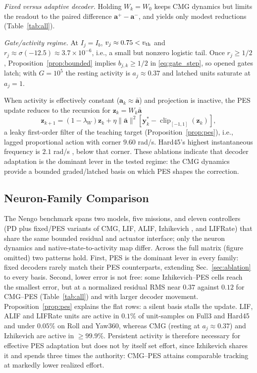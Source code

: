 \documentclass[letterpaper, 10 pt, conference]{ieeeconf}
\newcommand{\clip}{\operatorname{clip}}
\begin{document}
\emph{Fixed versus adaptive decoder.} Holding $W_k=W_0$ keeps CMG dynamics but limits the readout to the paired difference $\bm a^+-\bm a^-$, and yields only modest reductions (Table~\ref{tab:all}).

\emph{Gate/activity regime.} At $I_j=I_b$, $v_j\approx0.75<v_{\rm th}$ and $r_j\approx\sigma(-12.5)\approx3.7\times10^{-6}$, i.e., a small but nonzero logistic tail. Once $r_j\ge1/2$, Proposition~\ref{prop:bounded} implies $b_{j,k}\ge1/2$ in \eqref{eq:gate_step}, so opened gates latch; with $G=10^5$ the resting activity is $a_j\approx0.37$ and latched units saturate at $a_j=1$.

When activity is effectively constant ($\bm a_k\approx\bar{\bm a}$) and projection is inactive, the PES update reduces to the recursion for $\bm z_k=W_k\bar{\bm a}$
\begin{equation}
 \bm z_{k+1}=(1-\lambda_W)\bm z_k
 +\eta\|\bar{\bm a}\|^2[\bm y_k^*-\clip_{[-1,1]}(\bm z_k)],
 \label{eq:constantbasis}
\end{equation}
a leaky first-order filter of the teaching target (Proposition~\ref{prop:pes}), i.e., lagged proportional action with corner $9.60$ rad/s. Hard45's highest instantaneous frequency is $2.1$ rad/s \cite{sandoval2018instantaneous}, below that corner. These ablations indicate that decoder adaptation is the dominant lever in the tested regime: the CMG dynamics provide a bounded graded/latched basis on which PES shapes the correction.

\subsection{Neuron-Family Comparison}
\label{sec:family}

The Nengo benchmark spans two models, five missions, and eleven controllers (PD plus fixed/PES variants of CMG, LIF, ALIF, Izhikevich \cite{izhikevich2003}, and LIFRate) that share the same bounded residual and actuator interface; only the neuron dynamics and native-state-to-activity map differ. Across the full matrix (figure omitted) two patterns hold. First, PES is the dominant lever in every family: fixed decoders rarely match their PES counterparts, extending Sec.~\ref{sec:ablation} to every basis. Second, lower error is not free: some Izhikevich--PES cells reach the smallest error, but at a normalized residual RMS near $0.37$ against $0.12$ for CMG--PES (Table~\ref{tab:all}) and with larger decoder movement. Proposition~\ref{prop:pes} explains the flat rows: a silent basis stalls the update. LIF, ALIF and LIFRate units are active in $0.1\%$ of unit-samples on Full3 and Hard45 and under $0.05\%$ on Roll and Yaw360, whereas CMG (resting at $a_j\approx0.37$) and Izhikevich are active in ${\ge}99.9\%$. Persistent activity is therefore necessary for effective PES adaptation but does not by itself set effort, since Izhikevich shares it and spends three times the authority: CMG--PES attains comparable tracking at markedly lower realized effort.
\end{document}
